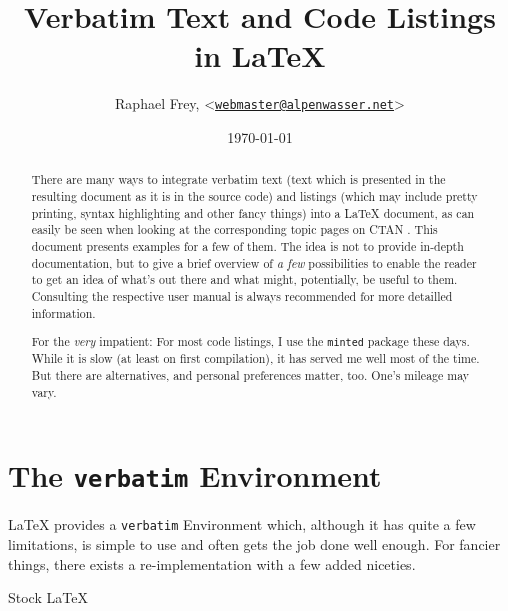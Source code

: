\documentclass[article,a4paper,oneside,10pt]{memoir}
\title{\textsf{\Huge Verbatim Text and Code Listings in \LaTeX}}
\author{Raphael Frey, <\href{mailto:webmaster@alpenwasser.net}{\nolinkurl{webmaster@alpenwasser.net}}>}
\date{\vspace{1em}\today}
\makeatletter
\renewcommand{\section}{%
  \sechook%
  \@startsection{section}{1}%
      {\secindent}%
      {\beforesecskip}%
      {\aftersecskip}%
      {\sffamily\secheadstyle}} %
\newcommand\code[1]{\texttt{#1}}
\makeatother
\begin{document}


\maketitle

\begin{abstract}
    There  are   many  ways  to   integrate  verbatim  text  (text   which  is
    presented  in  the  resulting  document  as it  is  in  the  source  code)
    and  listings  (which may  include  pretty  printing, syntax  highlighting
    and  other  fancy  things)  into   a  \LaTeX{}  document,  as  can  easily
    be  seen   when  looking  at   the  corresponding  topic  pages   on  CTAN
    \cite{ctan:topic:listings,ctan:topic:verbatim}. This   document   presents
    examples  for  a  few  of  them. The  idea  is  not  to  provide  in-depth
    documentation, but to give a  brief overview of \emph{a few} possibilities
    to enable the  reader to get an  idea of what's out there  and what might,
    potentially, be useful to them.   Consulting the respective user manual is
    always recommended for more detailled information.

    For  the  \emph{very}  impatient: For  most   code  listings,  I  use  the
    \code{minted}  package these  days. While it  is slow  (at least  on first
    compilation),  it has  served  me well  most of  the  time. But there  are
    alternatives,  and personal  preferences  matter,  too. One's mileage  may
    vary.
\end{abstract}

\tableofcontents*


\newpage
\chapter{The \code{verbatim} Environment}
\label{chap:verbatim}

\LaTeX{} provides a \code{verbatim} Environment which, although it has quite a
few limitations, is simple to use and often gets the job done well enough. For
fancier things, there exists a re-implementation with a few added niceties.


\section{Stock \LaTeX}
\label{sec:verbatim:stock}
\end{document}
